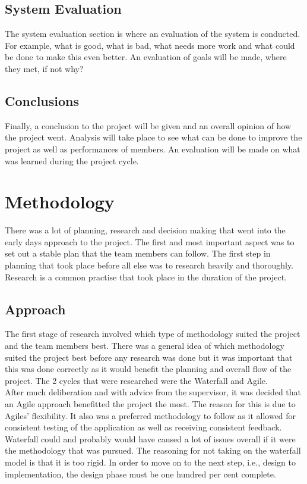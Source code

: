 \section{System Evaluation}
The system evaluation section is where an evaluation of the system is conducted. For example, what is good, what is bad, what needs more work and what could be done to make this even better. An evaluation of goals will be made, where they met, if not why?

\section{Conclusions}
Finally, a conclusion to the project will be given and an overall opinion of how the project went. Analysis will take place to see what can be done to improve the project as well as performances of members. An evaluation will be made on what was learned during the project cycle.

\chapter{Methodology}

There was a lot of planning, research and decision making that went into the early days approach to the project. The first and most important aspect was to set out a stable plan that the team members can follow. The first step in planning that took place before all else was to research heavily and thoroughly. Research is a common practise that took place in the duration of the project. 

\section{Approach}
The first stage of research involved which type of methodology suited the project and the team members best. There was a general idea of which methodology suited the project best before any research was done but it was important that this was done correctly as it would benefit the planning and overall flow of the project. The 2 cycles that were researched were the Waterfall and Agile.\cite{Methodologies}\\ 

After much deliberation and with advice from the supervisor, it was decided that an Agile approach benefitted the project the most. The reason for this is due to Agiles’ flexibility. It also was a preferred methodology to follow as it allowed for consistent testing of the application as well as receiving consistent feedback\cite{Methodologies}. Waterfall could and probably would have caused a lot of issues overall if it were the methodology that was pursued. The reasoning for not taking on the waterfall model is that it is too rigid. In order to move on to the next step, i.e., design to implementation, the design phase must be one hundred per cent complete. \\

